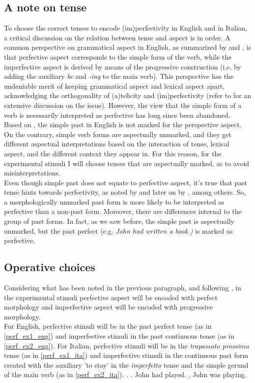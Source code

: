 \subsection{A note on tense}
To choose the correct tenses to encode (im)perfectivity in English and in Italian, a critical discussion on the relation between tense and aspect is in order. A common perspective on grammatical aspect in English, as summarized by \textcite[106]{smith1991parameter} and \textcite[663]{wagner2001aspectual}, is that perfective aspect corresponds to the simple form of the verb, while the imperfective aspect is derived by means of the progressive construction (i.e. by adding the auxiliary \textit{be} and \textit{-ing} to the main verb). This perspective has the undeniable merit of keeping grammatical aspect and lexical aspect apart, acknowledging the orthogonality of (a)telicity and (im)perfectivity (refer to \textcite{bertinetto2001frequent} for an extensive discussion on the issue). However, the view that the simple form of a verb is necessarily interpreted as perfective has long since been abandoned.\\
Based on \textcite{Olsen1997, bertinetto2001frequent}, the simple past in English is not marked for the perspective aspect. On the contrary, simple verb forms are aspectually unmarked, and they get different aspectual interpretations based on the interaction of tense, lexical aspect, and the different context they appear in. For this reason, for the experimental stimuli I will choose tenses that are aspectually marked, as to avoid misinterpretations.\\
Even though simple past does not equate to perfective aspect, it's true that past tense hints towards perfectivity, as noted by \textcite{comrie1976aspect} and later on by \textcite{wagner2001aspectual, Olsen1997, Medina2007}, among others. So, a morphologically unmarked past form is more likely to be interpreted as perfective than a non-past form. Moreover, there are differences internal to the group of past forms. In fact, as we saw before, the simple past is aspectually unmarked, but the past perfect (e.g. \textit{John had written a book.)} is marked as perfective.

\subsection{Operative choices}
Considering what has been noted in the previous paragraph, and following \textcite{Medina2007}, in the experimental stimuli perfective aspect will be encoded with perfect morphology and imperfective aspect will be encoded with progressive morphology.\\
For English, perfective stimuli will be in the past perfect tense (as in \ref{perf_ex1_eng}) and imperfective stimuli in the past continuous tense (as in \ref{perf_ex2_eng}). For Italian, perfective stimuli will be in the \textit{trapassato prossimo} tense (as in \ref{perf_ex1_ita}) and imperfective stimuli in the continuous past form created with the auxiliary 'to stay' in the \textit{imperfetto} tense and the simple gerund of the main verb (as in \ref{perf_ex2_ita}). 
\ex.\label{perf_ex_eng} \a. John had played. \label{perf_ex1_eng} 
\b. John was playing. \label{perf_ex2_eng}

